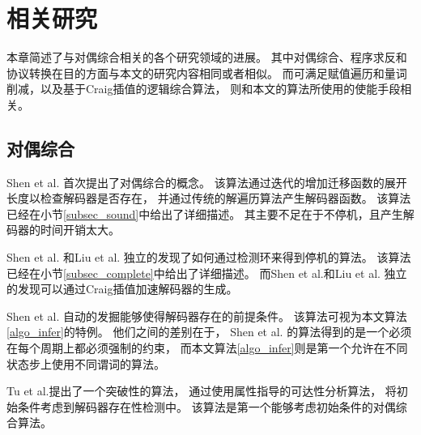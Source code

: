 \chapter{相关研究}
\label{chap:2}
%
%

本章简述了与对偶综合相关的各个研究领域的进展。
其中对偶综合、程序求反和协议转换在目的方面与本文的研究内容相同或者相似。
而可满足赋值遍历和量词削减，以及基于Craig插值的逻辑综合算法，
则和本文的算法所使用的使能手段相关。

\section{对偶综合}\label{subsec_compsyn_relat}
Shen et al. 首次提出了对偶综合的概念。
该算法通过迭代的增加迁移函数的展开长度以检查解码器是否存在，
并通过传统的解遍历算法产生解码器函数。
该算法已经在小节\ref{subsec_sound}中给出了详细描述。
其主要不足在于不停机，且产生解码器的时间开销太大。

Shen et al. 和Liu et al. 独立的发现了如何通过检测环来得到停机的算法。
该算法已经在小节\ref{subsec_complete}中给出了详细描述。
而Shen et al.和Liu et al. 独立的发现可以通过Craig插值加速解码器的生成。

Shen et al.  自动的发掘能够使得解码器存在的前提条件。
该算法可视为本文算法\ref{algo_infer}的特例。
他们之间的差别在于，
Shen et al. 的算法得到的是一个必须在每个周期上都必须强制的约束，
而本文算法\ref{algo_infer}则是第一个允许在不同状态步上使用不同谓词的算法。

Tu et al.提出了一个突破性的算法，
通过使用属性指导的可达性分析算法，
将初始条件考虑到解码器存在性检测中。
该算法是第一个能够考虑初始条件的对偶综合算法。

